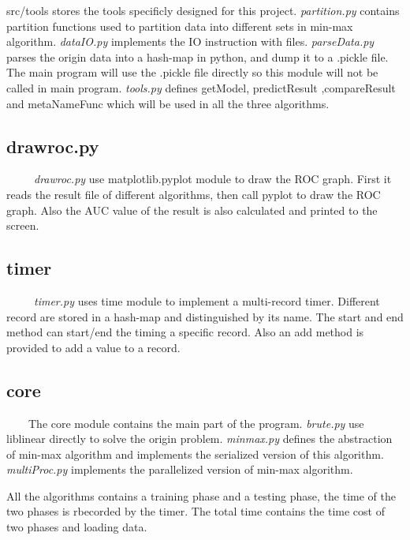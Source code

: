 \documentclass[11pt]{article}
\begin{document}
src/tools stores the tools specificly designed for this project. \emph{partition.py} contains
partition functions used to partition data into different sets in min-max algorithm. \emph{dataIO.py}
implements the IO instruction with files. \emph{parseData.py} parses the origin data into a hash-map
in python, and dump it to a .pickle file. The main program will use the .pickle file directly
so this module will not be called in main program. \emph{tools.py} defines getModel, predictResult
,compareResult and metaNameFunc which will be used in all the three algorithms.

\subsection{drawroc.py}
\label{sec-4-5}
\ \ \ \ \ \emph{drawroc.py} use matplotlib.pyplot module to draw the ROC graph.
First it reads the result file of different algorithms, then call pyplot
to draw the ROC graph. Also the AUC value of the result is also calculated
and printed to the screen.
\subsection{timer}
\label{sec-4-6}
\ \ \ \ \ \emph{timer.py} uses time module to implement a multi-record timer. Different record
are stored in a hash-map and distinguished by its name. The start and end method
can start/end the timing a specific record. Also an add method is provided to
add a value to a record.
\subsection{core}
\label{sec-4-7}
\ \ \ \ The core module contains the main part of the program.
\emph{brute.py} use liblinear directly to solve the origin problem.
\emph{minmax.py} defines the abstraction of min-max algorithm and implements
the serialized version of this algorithm.
\emph{multiProc.py} implements the parallelized version of min-max algorithm.

All the algorithms contains a training phase and a testing phase, the time of
the two phases is rbecorded by the timer. The total time contains the time
cost of two phases and loading data.
\end{document}
